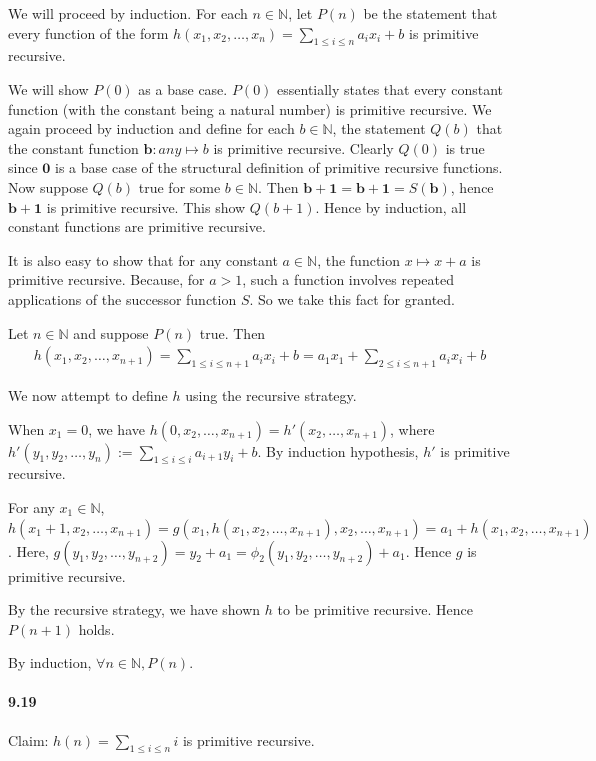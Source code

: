 \documentclass{article}
\begin{document}
We will proceed by induction. For each $n\in \mathbb{N}$, let $P(n)$ be the statement that every function of the form $h(x_1,x_2,\dots,x_n)=\sum_{1\leq i\leq n}a_ix_i + b$ is primitive recursive.

We will show $P(0)$ as a base case. $P(0)$ essentially states that every constant function (with the constant being a natural number) is primitive recursive. We again proceed by induction and define for each $b\in \mathbb{N}$, the statement $Q(b)$ that the constant function $\mathbf{b}: any\mapsto b$ is primitive recursive. Clearly $Q(0)$ is true since $\mathbf{0}$ is a base case of the structural definition of primitive recursive functions. Now suppose $Q(b)$ true for some $b\in \mathbb{N}$. Then $\mathbf{b+1}=\mathbf{b}+\mathbf{1}=S(\mathbf{b})$, hence $\mathbf{b+1}$ is primitive recursive. This show $Q(b+1)$. Hence by induction, all constant functions are primitive recursive.

It is also easy to show that for any constant $a\in \mathbb{N}$, the function $x\mapsto x+a$ is primitive recursive. Because, for $a>1$, such a function involves repeated applications of the successor function $S$. So we take this fact for granted.

Let $n\in \mathbb{N}$ and suppose $P(n)$ true. Then
\begin{align*}
	h(x_1,x_2,\dots,x_{n+1})=\sum_{1\leq i\leq n+1}a_ix_i + b = a_1x_1 + \sum_{2\leq i\leq n+1}a_ix_i + b
\end{align*}

We now attempt to define $h$ using the recursive strategy.

When $x_1=0$, we have $h(0, x_2, \dots, x_{n+1}) = h'(x_2,\dots, x_{n+1})$, where $h'(y_1, y_2,\dots, y_n):=\sum_{1\leq i\leq i}a_{i+1}y_i + b$. By induction hypothesis, $h'$ is primitive recursive.

For any $x_1\in \mathbb{N}$, $h(x_1+1,x_2,\dots, x_{n+1}) = g(x_1, h(x_1,x_2,\dots, x_{n+1}),x_2,\dots, x_{n+1}) = a_1+h(x_1,x_2,\dots, x_{n+1})$. Here, $g(y_1,y_2,\dots, y_{n+2}) = y_2 + a_1 = \phi_{2}(y_1,y_2,\dots, y_{n+2})+a_1$. Hence $g$ is primitive recursive.

By the recursive strategy, we have shown $h$ to be primitive recursive. Hence $P(n+1)$ holds.

By induction, $\forall n\in \mathbb{N}, P(n)$.

\paragraph{9.19} Claim: $h(n)=\sum_{1\leq i\leq n}i$ is primitive recursive.
\end{document}
